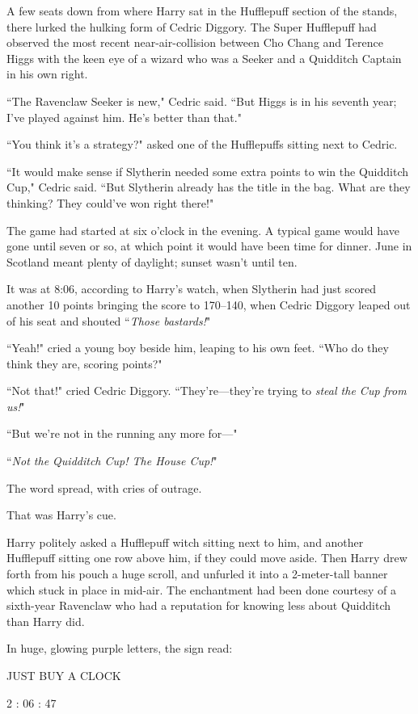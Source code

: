 A few seats down from where Harry sat in the Hufflepuff section of the stands, there lurked the hulking form of Cedric Diggory. The Super Hufflepuff had observed the most recent near-air-collision between Cho Chang and Terence Higgs with the keen eye of a wizard who was a Seeker and a Quidditch Captain in his own right.

``The Ravenclaw Seeker is new," Cedric said. ``But Higgs is in his seventh year; I've played against him. He's better than that."

``You think it's a strategy?" asked one of the Hufflepuffs sitting next to Cedric.

``It would make sense if Slytherin needed some extra points to win the Quidditch Cup," Cedric said. ``But Slytherin already has the title in the bag. What are they thinking? They could've won right there!"

The game had started at six o'clock in the evening. A typical game would have gone until seven or so, at which point it would have been time for dinner. June in Scotland meant plenty of daylight; sunset wasn't until ten.

It was at 8:06\pm, according to Harry's watch, when Slytherin had just scored another 10 points bringing the score to 170--{140}, when Cedric Diggory leaped out of his seat and shouted ``\emph{Those bastards!}"

``Yeah!" cried a young boy beside him, leaping to his own feet. ``Who do they think they are, scoring points?"

``Not that!" cried Cedric Diggory. ``They're—they're trying to \emph{steal the Cup from us!}"

``But we're not in the running any more for—"

``\emph{Not the Quidditch Cup! The House Cup!}"

The word spread, with cries of outrage.

That was Harry's cue.

Harry politely asked a Hufflepuff witch sitting next to him, and another Hufflepuff sitting one row above him, if they could move aside. Then Harry drew forth from his pouch a huge scroll, and unfurled it into a 2-meter-tall banner which stuck in place in mid-air. The enchantment had been done courtesy of a sixth-year Ravenclaw who had a reputation for knowing less about Quidditch than Harry did.

In huge, glowing purple letters, the sign read:

\begin{center}
JUST BUY A CLOCK

2 : 06 : 47
\end{center}

